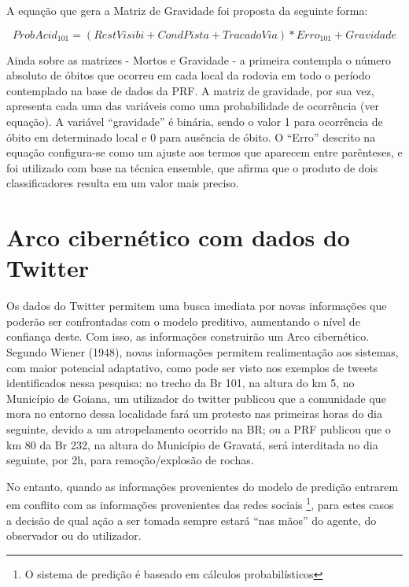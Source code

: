 A equação que gera a Matriz de Gravidade foi proposta da seguinte forma: 

\begin{equation}
ProbAcid_{101} = (RestVisibi + CondPista + TracadoVia) *  Erro_{101} + Gravidade
\end{equation} 

Ainda sobre as matrizes - Mortos e Gravidade - a primeira contempla o número absoluto de óbitos que ocorreu em cada local da rodovia em todo o período contemplado na base de dados da PRF. A matriz de gravidade, por sua vez, apresenta cada uma das variáveis como uma probabilidade de ocorrência (ver equação). A variável ``gravidade'' é binária, sendo o valor 1 para ocorrência de óbito em determinado local e 0 para ausência de óbito. O ``Erro'' descrito na equação configura-se como um ajuste aos termos que aparecem entre parênteses, e foi utilizado com base na técnica ensemble, que afirma que o produto de dois classificadores resulta em um valor mais preciso.    



\pagebreak

\section{Arco cibernético com dados do Twitter}

Os dados do Twitter permitem uma busca imediata por novas informações que poderão ser confrontadas com o 
modelo preditivo, aumentando o nível de confiança deste. Com isso, as informações construirão um Arco cibernético. Segundo Wiener (1948), novas informações permitem realimentação aos sistemas, com maior potencial adaptativo, como pode ser visto nos exemplos de tweets identificados nessa pesquisa: no trecho da Br 101, na altura do km 5, no 
Município de Goiana, um utilizador do twitter publicou que a comunidade que mora no entorno dessa localidade fará um protesto nas primeiras horas do dia seguinte, devido a um  
atropelamento ocorrido na BR; ou a PRF publicou que o km 80 da Br 232, na altura do Município de Gravatá, será interditada no dia seguinte, por 2h, para 
remoção/explosão de rochas.

No entanto, quando as informações provenientes do modelo de predição entrarem em conflito com as informações 
provenientes das redes sociais \footnote{O sistema de predição é baseado em cálculos probabilísticos}, para estes casos a decisão de qual ação a ser tomada sempre estará ``nas mãos'' do agente, do observador ou do utilizador.


